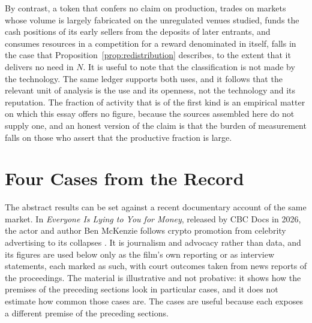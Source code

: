 \documentclass[11pt]{article}
\theoremstyle{remark}
\begin{document}
By contrast, a token that confers no claim on production, trades on markets whose volume is largely fabricated on the unregulated venues studied, funds the cash positions of its early sellers from the deposits of later entrants, and consumes resources in a competition for a reward denominated in itself, falls in the case that Proposition~\ref{prop:redistribution} describes, to the extent that it delivers no need in $N$. It is useful to note that the classification is not made by the technology. The same ledger supports both uses, and it follows that the relevant unit of analysis is the use and its openness, not the technology and its reputation. The fraction of activity that is of the first kind is an empirical matter on which this essay offers no figure, because the sources assembled here do not supply one, and an honest version of the claim is that the burden of measurement falls on those who assert that the productive fraction is large.

\section{Four Cases from the Record}\label{sec:cases}

The abstract results can be set against a recent documentary account of the same market. In \emph{Everyone Is Lying to You for Money}, released by CBC Docs in 2026, the actor and author Ben McKenzie follows crypto promotion from celebrity advertising to its collapses \cite{mckenzie2026}. It is journalism and advocacy rather than data, and its figures are used below only as the film's own reporting or as interview statements, each marked as such, with court outcomes taken from news reports of the proceedings. The material is illustrative and not probative: it shows how the premises of the preceding sections look in particular cases, and it does not estimate how common those cases are. The cases are useful because each exposes a different premise of the preceding sections.
\end{document}
